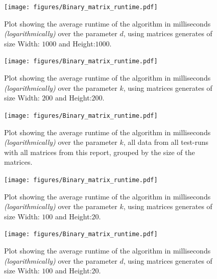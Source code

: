 \documentclass{beamer}
\begin{document}
\begin{frame}
  \begin{figure}
    \centering
    \texttt{[image: figures/Binary\_matrix\_runtime.pdf]}
    \caption{Plot showing the average runtime of the algorithm in milliseconds \textit{(logarithmically)}
      over the parameter $d$, using matrices generates of size Width: $1000$ and Height:$1000$.}
  \end{figure}
\end{frame}

\begin{frame}
  \begin{figure}
    \centering
    \texttt{[image: figures/Binary\_matrix\_runtime.pdf]}
    \caption{Plot showing the average runtime of the algorithm in milliseconds \textit{(logarithmically)}
      over the parameter $k$, using matrices generates of size Width: $200$ and Height:$200$.}
  \end{figure}
\end{frame}

\begin{frame}
  \begin{figure}
    \centering
    \texttt{[image: figures/Binary\_matrix\_runtime.pdf]}
    \caption{Plot showing the average runtime of the algorithm in milliseconds \textit{(logarithmically)}
      over the parameter $k$, all data from all test-runs with all matrices from this report, grouped by
      the size of the matrices.}
  \end{figure}
\end{frame}

\begin{frame}
  \begin{figure}
    \centering
    \texttt{[image: figures/Binary\_matrix\_runtime.pdf]}
    \caption{Plot showing the average runtime of the algorithm in milliseconds \textit{(logarithmically)}
      over the parameter $k$, using matrices generates of size Width: $100$ and Height:$20$.}
  \end{figure}
\end{frame}

\begin{frame}
  \begin{figure}
    \centering
    \texttt{[image: figures/Binary\_matrix\_runtime.pdf]}
    \caption{Plot showing the average runtime of the algorithm in milliseconds \textit{(logarithmically)}
      over the parameter $d$, using matrices generates of size Width: $100$ and Height:$20$.}
  \end{figure}
\end{frame}
\end{document}
